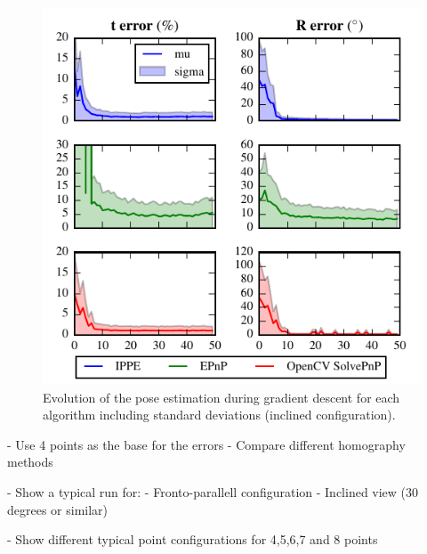 \documentclass[letterpaper, 10 pt, conference]{ieeeconf}  %
\begin{document}
\begin{figure}[t]
  \begin{center}
    \showthe\columnwidth %
    \includegraphics[width=\columnwidth]{img/pose_separate_inclined.pdf}
    \caption{\label{fig:homography_results} Evolution of the pose estimation during gradient descent for each algorithm including standard deviations (inclined configuration).}
  \end{center}
\end{figure}



- Use 4 points as the base for the errors
- Compare different homography methods




- Show a typical run for:
	- Fronto-parallell configuration
	- Inclined view (30 degrees or similar)
		
	
- Show different typical point configurations for 4,5,6,7 and 8 points
\end{document}
